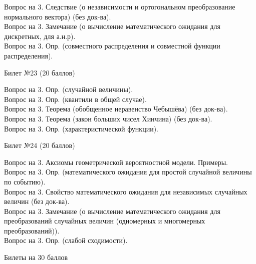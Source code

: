 \documentclass[preview]{standalone}
\begin{document}
Вопрос на 3.  Следствие (о независимости и  ортогональном преобразование нормального вектора) (без док-ва). \\ 
Вопрос на 3.  Замечание (о вычисление  математического ожидания для дискретных, для а.н.р). \\
Вопрос на 3.  Опр. (совместного распределения и  совместной функции распределения). \\
\begin{center} {\Large Билет №23 (20 баллов)} \end{center}
Вопрос на 3.  Опр. (случайной величины). \\ 
Вопрос на 3.   Опр. (квантили в общей случае). \\
Вопрос на 3. Теорема (обобщенное неравенство Чебышёва) (без док-ва). \\
Вопрос на 3. Теорема (закон больших чисел Хинчина) (без док-ва). \\
Вопрос на 3.  Опр. (характеристической функции). \\
\begin{center} {\Large Билет №24 (20 баллов)} \end{center}
Вопрос на 3. Аксиомы геометрической вероятностной модели. Примеры. \\
Вопрос на 3.  Опр. (математического ожидания для простой случайной величины по событию). \\
Вопрос на 3. Свойство  математического ожидания для независимых случайных величин (без док-ва). \\
Вопрос на 3.  Замечание (о вычисление  математического ожидания для преобразований случайных величин (одномерных и многомерных преобразований)). \\
Вопрос на 3. Опр. (слабой сходимости). \\


\begin{center}
    Билеты на 30 баллов
\end{center}
\end{document}

